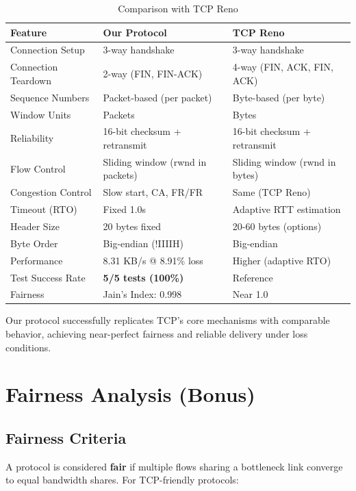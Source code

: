 \documentclass[11pt,a4paper]{article}
\begin{document}
\begin{table}[H]
\centering
\begin{tabular}{@{}lll@{}}
\toprule
\textbf{Feature} & \textbf{Our Protocol} & \textbf{TCP Reno} \\ \midrule
Connection Setup & 3-way handshake & 3-way handshake \\
Connection Teardown & 2-way (FIN, FIN-ACK) & 4-way (FIN, ACK, FIN, ACK) \\
Sequence Numbers & Packet-based (per packet) & Byte-based (per byte) \\
Window Units & Packets & Bytes \\
Reliability & 16-bit checksum + retransmit & 16-bit checksum + retransmit \\
Flow Control & Sliding window (rwnd in packets) & Sliding window (rwnd in bytes) \\
Congestion Control & Slow start, CA, FR/FR & Same (TCP Reno) \\
Timeout (RTO) & Fixed 1.0s & Adaptive RTT estimation \\
Header Size & 20 bytes fixed & 20-60 bytes (options) \\
Byte Order & Big-endian (!IIIIH) & Big-endian \\
Performance & 8.31 KB/s @ 8.91\% loss & Higher (adaptive RTO) \\
Test Success Rate & \textbf{5/5 tests (100\%)} & Reference \\
Fairness & Jain's Index: 0.998 & Near 1.0 \\ \bottomrule
\end{tabular}
\caption{Comparison with TCP Reno}
\end{table}

Our protocol successfully replicates TCP's core mechanisms with comparable behavior, achieving near-perfect fairness and reliable delivery under loss conditions.

\section{Fairness Analysis (Bonus)}

\subsection{Fairness Criteria}

A protocol is considered \textbf{fair} if multiple flows sharing a bottleneck link converge to equal bandwidth shares. For TCP-friendly protocols:
\end{document}
